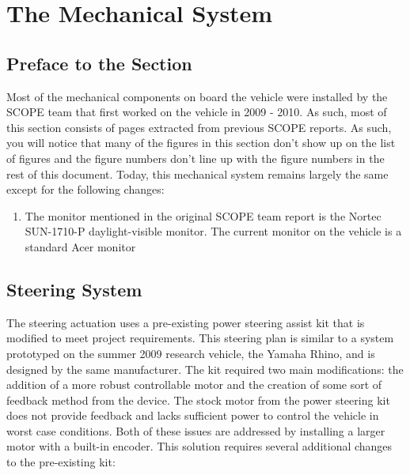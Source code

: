 \section{The Mechanical System}

\subsection{Preface to the Section}
Most of the mechanical components on board the vehicle were installed by the SCOPE team that first worked on the vehicle in 2009 - 2010. As such, most of this section consists of pages extracted from previous SCOPE reports. As such, you will notice that many of the figures in this section don't show up on the list of figures and the figure numbers don't line up with the figure numbers in the rest of this document. 
%
Today, this mechanical system remains largely the same except for the following changes:

\begin{enumerate}
\item The monitor mentioned in the original SCOPE team report is the Nortec SUN-1710-P daylight-visible monitor. The current monitor on the vehicle is a standard Acer monitor
\end{enumerate}

\newpage







\newpage

\subsection{Steering System}
The steering actuation uses a pre-existing power steering assist kit that is modified to meet project requirements. This steering plan is similar to a system prototyped on the summer 2009 research vehicle, the Yamaha Rhino, and is designed by the same manufacturer. The kit required two main modifications: the addition of a more robust controllable motor and the creation of some sort of feedback method from the device. The stock motor from the power steering kit does not provide feedback and lacks sufficient power to control the vehicle in worst case conditions. Both of these issues are addressed by installing a larger motor with a built-in encoder. This solution requires several additional changes to the pre-existing kit: 

